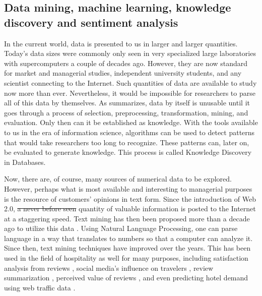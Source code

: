 \documentclass[smallextended,natbib]{svjour3}       %
\providecommand{\DIFadd}[1]{{\protect\color{blue}\uwave{#1}}} %
\providecommand{\DIFdel}[1]{{\protect\color{red}\sout{#1}}}                      %
\providecommand{\DIFaddbegin}{} %
\providecommand{\DIFaddend}{} %
\providecommand{\DIFdelbegin}{} %
\providecommand{\DIFdelend}{} %
\newcommand{\DIFscaledelfig}{0.5}
\newlength{\DIFdelgraphicswidth} %
\newlength{\DIFdelgraphicsheight} %
\newcommand{\DIFaddincludegraphics}[2][]{{\color{blue}\fbox{\DIFOincludegraphics[#1]{#2}}}} %
\newcommand{\DIFdelincludegraphics}[2][]{%
\sbox{\DIFdelgraphicsbox}{\DIFOincludegraphics[#1]{#2}}%
\settoboxwidth{\DIFdelgraphicswidth}{\DIFdelgraphicsbox} %
\settoboxtotalheight{\DIFdelgraphicsheight}{\DIFdelgraphicsbox} %
\scalebox{\DIFscaledelfig}{%
\parbox[b]{\DIFdelgraphicswidth}{\usebox{\DIFdelgraphicsbox}\\[-\baselineskip] \rule{\DIFdelgraphicswidth}{0em}}\llap{\resizebox{\DIFdelgraphicswidth}{\DIFdelgraphicsheight}{%
\setlength{\unitlength}{\DIFdelgraphicswidth}%
\begin{picture}(1,1)%
\thicklines\linethickness{2pt} %
{\color[rgb]{1,0,0}\put(0,0){\framebox(1,1){}}}%
{\color[rgb]{1,0,0}\put(0,0){\line( 1,1){1}}}%
{\color[rgb]{1,0,0}\put(0,1){\line(1,-1){1}}}%
\end{picture}%
}\hspace*{3pt}}} %
} %
\DeclareRobustCommand{\DIFaddbegin}{\DIFOaddbegin \let\includegraphics\DIFaddincludegraphics} %
\DeclareRobustCommand{\DIFaddend}{\DIFOaddend \let\includegraphics\DIFOincludegraphics} %
\DeclareRobustCommand{\DIFdelbegin}{\DIFOdelbegin \let\includegraphics\DIFdelincludegraphics} %
\DeclareRobustCommand{\DIFdelend}{\DIFOaddend \let\includegraphics\DIFOincludegraphics} %
\begin{document}
  \subsection{Data mining, machine learning, knowledge discovery and sentiment analysis}\label{theory_data}

    In the current world, data is presented to us in larger and larger quantities. Today's data sizes were commonly only seen in very specialized large laboratories with supercomputers a couple of decades ago. However, they are now standard for market and managerial studies, independent university students, and any scientist connecting to the Internet. Such quantities of data are available to study now more than ever. Nevertheless, it would be impossible for researchers to parse all of this data by themselves. As \cite{fayyad1996data} summarizes, data by itself is unusable until it goes through a process of selection, preprocessing, transformation, mining, and evaluation. Only then can it be established as knowledge. With the tools available to us in the era of information science, algorithms can be used to detect patterns that would take researchers too long to recognize. These patterns can, later on, be evaluated to generate knowledge. This process is called Knowledge Discovery in Databases. 

    Now, there are, of course, many sources of numerical data to be explored.  However, perhaps what is most available and interesting to managerial purposes is the resource of customers' opinions in text form. Since the introduction of Web 2.0, \DIFdelbegin \DIFdel{a never before seen }\DIFdelend \DIFaddbegin \DIFadd{an unprecedented }\DIFaddend quantity of valuable information is posted to the Internet at a staggering speed. Text mining has then been proposed more than a decade ago to utilize this data \cite[e.g.][]{rajman1998text,nahm2002text}. Using Natural Language Processing, one can parse language in a way that translates to numbers so that a computer can analyze it. Since then, text mining techniques have improved over the years. This has been used in the field of hospitality as well for many purposes, including satisfaction analysis from reviews \cite[e.g][]{berezina2016, xu2016, xiang2015, hargreaves2015, balbi2018}, social media's influence on travelers \cite[e.g.][]{xiang2010}, review summarization \cite[e.g.][]{hu2017436}, perceived value of reviews \cite[e.g][]{FANG2016498}, and even predicting hotel demand using web traffic data \cite[e.g][]{yang2014}.
\end{document}
